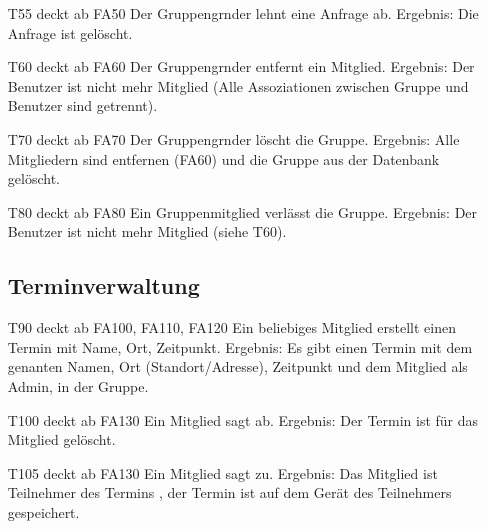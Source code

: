 \documentclass{scrartcl}
\begin{document}
\begin{itemize}
		\item[T55] deckt ab FA50  \newline
		Der \gls{Gruppengrnder} lehnt eine Anfrage ab. \newline
		Ergebnis: Die Anfrage ist gelöscht.

		\item[T60] deckt ab FA60  \newline
		Der \gls{Gruppengrnder} entfernt ein Mitglied.  \newline
		Ergebnis: Der Benutzer ist nicht mehr Mitglied (Alle Assoziationen zwischen Gruppe und Benutzer sind getrennt).

		\item[T70] deckt ab FA70  \newline
		Der \gls{Gruppengrnder} löscht die Gruppe.  \newline
		Ergebnis: Alle Mitgliedern sind entfernen (FA60) und die Gruppe aus der Datenbank gelöscht.

		\item[T80] deckt ab FA80  \newline
		Ein Gruppenmitglied verlässt die Gruppe.  \newline
		Ergebnis: Der Benutzer ist nicht mehr \gls{Mitglied} (siehe T60).

	\subsection{Terminverwaltung}

		\item[T90] deckt ab FA100, FA110, FA120  \newline
		Ein beliebiges \gls{Mitglied} erstellt einen Termin mit Name, Ort, Zeitpunkt.  \newline
		Ergebnis: Es gibt einen Termin mit dem genanten Namen, Ort (Standort/Adresse), Zeitpunkt und dem Mitglied als 				Admin, in der Gruppe.
		
		\item [T100] deckt ab FA130  \newline
		Ein \gls{Mitglied} sagt ab.  \newline
		Ergebnis: Der Termin ist für das Mitglied gelöscht.

		\item[T105] deckt ab FA130  \newline
		Ein Mitglied sagt zu.  \newline
		Ergebnis: Das Mitglied ist \gls{Teilnehmer} des Termins , der Termin ist auf dem Gerät des Teilnehmers gespeichert.


\end{itemize}
\end{document}
